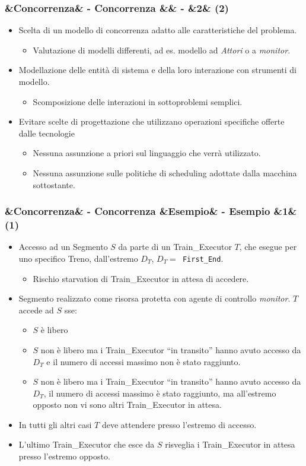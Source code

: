 \documentclass[slidestop,compress,blackandwhite]{beamer}
\newcommand{\ttt}[1]{\texttt{#1}}
\newcommand{\ii}[1]{\textit{#1}}
\newcommand{\cm}[1]{\vspace{#1cm}}
\newcommand{\newtitle}[4]{
	#1 
	\ifx&#2&%
	\else
  		\large- #2
	\fi
	\ifx&#3&%
	\else
  		\normalsize- #3
	\fi
	\ifx&#4&%
	\else
  		\normalsize (#4)
	\fi
}
\newcommand{\newframe}[5]{
	\begin{frame}
		\frametitle{\newtitle{#1}{#2}{#3}{#4}}
		#5
	\end{frame}
}
\newcommand{\myitemize}[1]{
	\begin{itemize}\itemsep4pt
	#1
	\end{itemize}
}
\begin{document}
	
	\newframe{}{Concorrenza}{}{2}{
		\justifying
		\cm{0.5}
		\myitemize {
			\item Scelta di un modello di concorrenza adatto alle caratteristiche del problema.
				\myitemize{
					\item Valutazione di modelli differenti, ad es. modello ad \ii{Attori} o a \ii{monitor}.
				}
			\item Modellazione delle entità di sistema e della loro interazione con strumenti di modello.
				\myitemize {
					\item Scomposizione delle interazioni in sottoproblemi semplici.
				}
			\item Evitare scelte di progettazione che utilizzano operazioni specifiche offerte dalle tecnologie
				\myitemize {
					\item Nessuna assunzione a priori sul linguaggio che verrà utilizzato.
					\item Nessuna assunzione sulle politiche di scheduling adottate dalla macchina sottostante.
				}
		}
		
	}
	
	\newframe{}{Concorrenza}{Esempio}{1}{
		\cm{-0.1}
		\footnotesize
		\myitemize {
			\item Accesso ad un Segmento $S$ da parte di un Train\_Executor $T$, che esegue per uno specifico Treno, dall'estremo $D_T$, $D_T=$\ttt{ First\_End}.
				\myitemize {
					\item \footnotesize Rischio starvation di Train\_Executor in attesa di accedere.
				}
			\item Segmento realizzato come risorsa protetta con agente di controllo \ii{monitor}. $T$ accede ad $S$ sse:
				\myitemize{
					\item \footnotesize $S$ è libero
					\item $S$ non è libero ma i Train\_Executor ``in transito'' hanno avuto accesso da $D_T$ e il numero di accessi massimo non è stato raggiunto.
					\item $S$ non è libero ma i Train\_Executor ``in transito'' hanno avuto accesso da $D_T$, il numero di accessi massimo è stato raggiunto, ma all'estremo opposto non vi sono altri Train\_Executor in attesa.
				}
			\item In tutti gli altri casi $T$ deve attendere presso l'estremo di accesso.
			\item L'ultimo Train\_Executor che esce da $S$ risveglia i Train\_Executor in attesa presso l'estremo opposto.
		}	
	}
	
\end{document}

